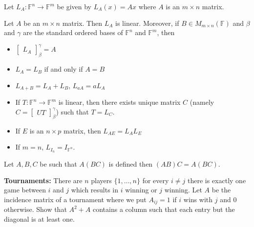 \documentclass[12pt]{article}
\newenvironment{theorem}[2][Theorem]{\begin{trivlist}
\item[\hskip \labelsep {\bfseries #1}\hskip \labelsep {\bfseries #2.}]}{\end{trivlist}}
\begin{document}
\vspace{1em}

\noindent Let $L_A : \mathbb{F}^n \to \mathbb{F}^m$ be given by $L_A(x) = Ax$ where $A$ is an $m \times n$ matrix.

\begin{theorem}{2.15}
Let $A$ be an $m \times n$ matrix. Then $L_A$ is linear. Moreover, if $B \in M_{m \times n}(\mathbb{F})$ and $\beta$ and $\gamma$ are the standard ordered bases of $\mathbb{F}^n$ and $\mathbb{F}^m$, then

\begin{itemize}
    \item[(a)] $\begin{bmatrix} L_A \end{bmatrix}_\beta^\gamma = A$ 
    
    \item[(b)] $L_A = L_B$ if and only if $A = B$
    
    \item[(c)] $L_{A+B} = L_A + L_B$, $L_{aA} = aL_A$
    
    \item[(d)] If $T : \mathbb{F}^n \to \mathbb{F}^m$ is linear, then there exists unique matrix $C$ (namely $C = \begin{bmatrix} UT \end{bmatrix}_\beta^\gamma$) such that $T = L_C$.
    
    \item[(e)] If $E$ is an $n \times p$ matrix, then $L_{AE} = L_AL_E$
    
    \item[(f)] If $m = n$, $L_{I_n} = I_{\mathbb{F}^n}$.
\end{itemize}
\end{theorem}

\begin{theorem}{2.16}
Let $A, B, C$ be such that $A(BC)$ is defined then $(AB)C = A(BC)$.
\end{theorem}

\textbf{Tournaments:} There are $n$ players $\{1, \dots, n\}$ for every $i \neq j$ there is exactly one game between $i$ and $j$ which results in $i$ winning or $j$ winning. Let $A$ be the incidence matrix of a tournament where we put $A_{ij} = 1$ if $i$ wins with $j$ and $0$ otherwise. Show that $A^2 + A$ contains a column such that each entry but the diagonal is at least one.
\end{document}
